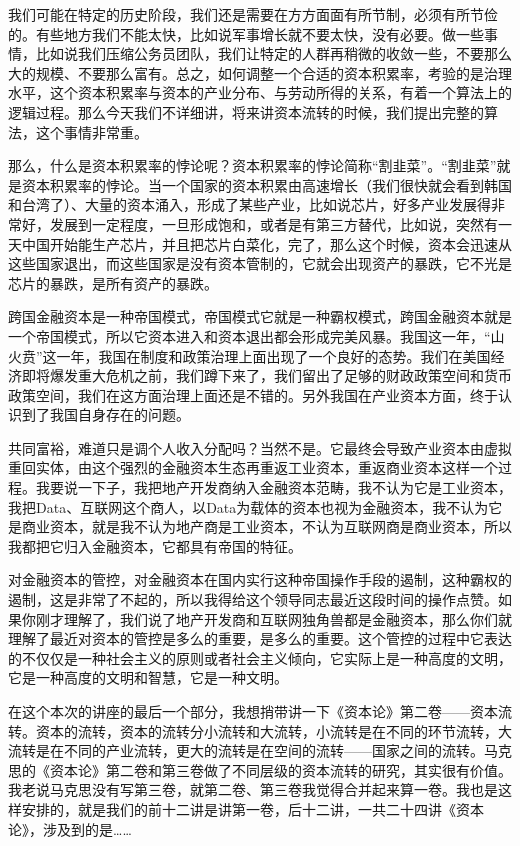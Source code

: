 \documentclass[UTF8, 12pt, a4paper]{ctexrep}
\begin{document}
我们可能在特定的历史阶段，我们还是需要在方方面面有所节制，必须有所节俭的。有些地方我们不能太快，比如说军事增长就不要太快，没有必要。做一些事情，比如说我们压缩公务员团队，我们让特定的人群再稍微的收敛一些，不要那么大的规模、不要那么富有。总之，如何调整一个合适的资本积累率，考验的是治理水平，这个资本积累率与资本的产业分布、与劳动所得的关系，有着一个算法上的逻辑过程。那么今天我们不详细讲，将来讲资本流转的时候，我们提出完整的算法，这个事情非常重。

那么，什么是资本积累率的悖论呢？资本积累率的悖论简称“割韭菜”。“割韭菜”就是资本积累率的悖论。当一个国家的资本积累由高速增长（我们很快就会看到韩国和台湾了）、大量的资本涌入，形成了某些产业，比如说芯片，好多产业发展得非常好，发展到一定程度，一旦形成饱和，或者是有第三方替代，比如说，突然有一天中国开始能生产芯片，并且把芯片白菜化，完了，那么这个时候，资本会迅速从这些国家退出，而这些国家是没有资本管制的，它就会出现资产的暴跌，它不光是芯片的暴跌，是所有资产的暴跌。

跨国金融资本是一种帝国模式，帝国模式它就是一种霸权模式，跨国金融资本就是一个帝国模式，所以它资本进入和资本退出都会形成完美风暴。我国这一年，“山火贲”这一年，我国在制度和政策治理上面出现了一个良好的态势。我们在美国经济即将爆发重大危机之前，我们蹲下来了，我们留出了足够的财政政策空间和货币政策空间，我们在这方面治理上面还是不错的。另外我国在产业资本方面，终于认识到了我国自身存在的问题。

共同富裕，难道只是调个人收入分配吗？当然不是。它最终会导致产业资本由虚拟重回实体，由这个强烈的金融资本生态再重返工业资本，重返商业资本这样一个过程。我要说一下子，我把地产开发商纳入金融资本范畴，我不认为它是工业资本，我把Data、互联网这个商人，以Data为载体的资本也视为金融资本，我不认为它是商业资本，就是我不认为地产商是工业资本，不认为互联网商是商业资本，所以我都把它归入金融资本，它都具有帝国的特征。

对金融资本的管控，对金融资本在国内实行这种帝国操作手段的遏制，这种霸权的遏制，这是非常了不起的，所以我得给这个领导同志最近这段时间的操作点赞。如果你刚才理解了，我们说了地产开发商和互联网独角兽都是金融资本，那么你们就理解了最近对资本的管控是多么的重要，是多么的重要。这个管控的过程中它表达的不仅仅是一种社会主义的原则或者社会主义倾向，它实际上是一种高度的文明，它是一种高度的文明和智慧，它是一种文明。

在这个本次的讲座的最后一个部分，我想捎带讲一下《资本论》第二卷——资本流转。资本的流转，资本的流转分小流转和大流转，小流转是在不同的环节流转，大流转是在不同的产业流转，更大的流转是在空间的流转——国家之间的流转。马克思的《资本论》第二卷和第三卷做了不同层级的资本流转的研究，其实很有价值。我老说马克思没有写第三卷，就第二卷、第三卷我觉得合并起来算一卷。我也是这样安排的，就是我们的前十二讲是讲第一卷，后十二讲，一共二十四讲《资本论》，涉及到的是……
\end{document}
